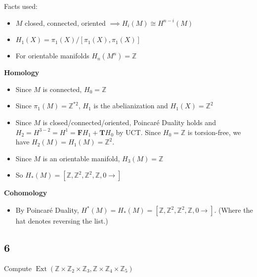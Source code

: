 \begin{solution}

Facts used:

\begin{itemize}
\tightlist
\item
  \(M\) closed, connected, oriented \(\implies H_i(M)\cong H^{n-i}(M)\)
\item
  \(H_1(X) = \pi_1(X) / [\pi_1(X), \pi_1(X)]\)
\item
  For orientable manifolds \(H_n(M^n) = {\mathbb{Z}}\)
\end{itemize}

\textbf{Homology}

\begin{itemize}
\tightlist
\item
  Since \(M\) is connected, \(H_0 = {\mathbb{Z}}\)
\item
  Since \(\pi_1(M) = {\mathbb{Z}}^{\ast 2}\), \(H_1\) is the
  abelianization and \(H_1(X) = {\mathbb{Z}}^2\)
\item
  Since \(M\) is closed/connected/oriented, Poincaré Duality holds and
  \(H_2 = H^{3-2} = H^1 = \mathbf{F} H_1 + \mathbf{T}H_0\) by UCT. Since
  \(H_0={\mathbb{Z}}\) is torsion-free, we have
  \(H_2(M) = H_1(M) = {\mathbb{Z}}^2\).
\item
  Since \(M\) is an orientable manifold, \(H_3(M) = {\mathbb{Z}}\)
\item
  So
  \(H_*(M) = [{\mathbb{Z}}, {\mathbb{Z}}^2, {\mathbb{Z}}^2, {\mathbb{Z}}, 0\rightarrow]\)
\end{itemize}

\textbf{Cohomology}

\begin{itemize}
\tightlist
\item
  By Poincaré Duality,
  \(H^*(M) = \widehat{H_*(M)} = [{\mathbb{Z}}, {\mathbb{Z}}^2, {\mathbb{Z}}^2, {\mathbb{Z}}, 0\rightarrow]\).
  (Where the hat denotes reversing the list.)
\end{itemize}

\end{solution}

\hypertarget{section-10}{%
\subsection{6}\label{section-10}}

Compute
\(\operatorname{Ext} ({\mathbb{Z}}\times {\mathbb{Z}}_2 \times {\mathbb{Z}}_3, {\mathbb{Z}}\times {\mathbb{Z}}_4 \times {\mathbb{Z}}_5)\)

